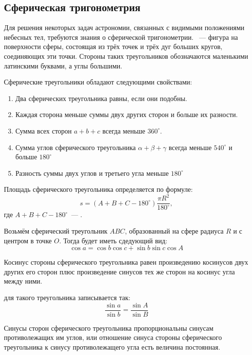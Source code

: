 \subsection{Сферическая тригонометрия}
Для решения некоторых задач астрономии, связанных с видимыми положениями небесных тел, требуются знания о сферической тригонометрии. ~--- фигура на поверхности сферы, состоящая из трёх точек и трёх дуг больших кругов, соединяющих эти точки. Стороны таких треугольников обозначаются маленькими латинскими буквами, а углы большими.

Сферические треугольники обладают следующими свойствами:
\begin{enumerate}
\item Два сферических треугольника равны, если они подобны.
\item Каждая сторона меньше суммы двух других сторон и больше их разности.
\item Сумма всех сторон $a+b+c$ всегда меньше $360^{\circ}$.
\item Сумма углов сферического треугольника $\alpha +\beta +\gamma$ всегда меньше $540^{\circ}$  и больше $180^{\circ}$
\item Разность суммы двух углов и третьего угла меньше $180^{\circ}$
\end{enumerate}

Площадь сферического треугольника определяется по формуле:
\begin{equation}
s=(A+B+C-180^{\circ})\frac{\pi R^2}{180^{\circ}},
\end{equation}
где $A+B+C-180^{\circ}$~--- .

Возьмём сферический треугольник $ABC$, образованный на сфере радиуса $R$ и с центром в точке $O$.  Тогда  будет иметь сдедующий вид:
\begin{equation}
\cos a=\cos b\cos c+\sin b\sin c\cos A
\end{equation}

Косинус стороны сферического треугольника равен произведению косинусов двух других его сторон плюс произведение синусов тех же сторон на косинус угла между ними.

 для такого треугольника записывается так:
\begin{equation}
\frac{\sin a}{\sin b}=\frac{\sin A}{\sin B}
\end{equation}

Синусы сторон сферического треугольника пропорциональны синусам противолежащих им углов, или отношение синуса стороны сферического треугольника к синусу противолежащего угла есть величина постоянная.


